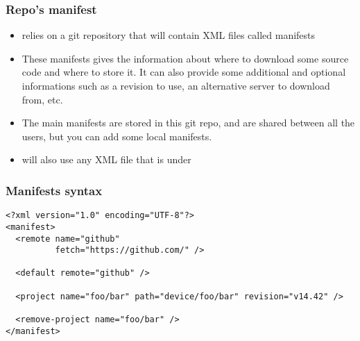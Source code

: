 \begin{frame}
  \frametitle{Repo's manifest}
  \begin{itemize}
  \item {} relies on a git repository that will contain XML
    files called manifests
  \item These manifests gives the information about where to download
    some source code and where to store it. It can also provide some
    additional and optional informations such as a revision to use, an
    alternative server to download from, etc.
  \item The main manifests are stored in this git repo, and are shared
    between all the users, but you can add some local manifests.
  \item {} will also use any XML file that is under
  \end{itemize}
\end{frame}

\begin{frame}[fragile]
  \frametitle{Manifests syntax}
\begin{verbatim}
<?xml version="1.0" encoding="UTF-8"?>
<manifest>
  <remote name="github"
          fetch="https://github.com/" />

  <default remote="github" />

  <project name="foo/bar" path="device/foo/bar" revision="v14.42" />

  <remove-project name="foo/bar" />
</manifest>
\end{verbatim}
\end{frame}